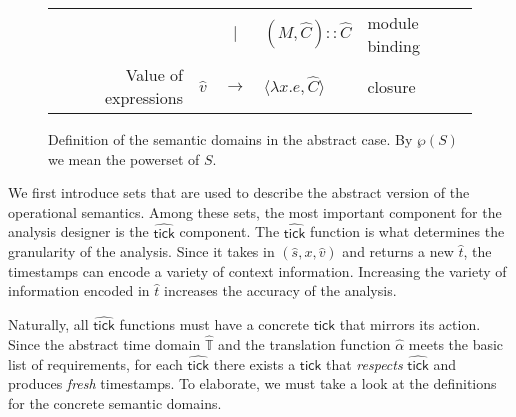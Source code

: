 \documentclass{article}
\theoremstyle{definition}
\newcommand*{\vbar}{|}
\newcommand*{\cons}{::}
\newcommand*{\Time}{\mathbb{T}}
\newcommand*{\tick}{\mathsf{tick}}
\begin{document}
\begin{figure}[h!]
\begin{tabular}{rrcll}
                                 &                   & $\vbar$       & $(M,\widehat{C})\cons \widehat{C}$                                                                        & module binding     \\
    Value of expressions         & $\widehat{v}$     & $\rightarrow$ & $\langle \lambda x.e, \widehat{C} \rangle$                                                                & closure
  \end{tabular}
  \caption{Definition of the semantic domains in the abstract case. By $\wp(S)$ we mean the powerset of $S$.}
\end{figure}
We first introduce sets that are used to describe the abstract version of the operational semantics.
Among these sets, the most important component for the analysis designer is the $\widehat{\tick}$ component.
The $\widehat{\tick}$ function is what determines the granularity of the analysis.
Since it takes in $(\widehat{s},x,\widehat{v})$ and returns a new $\widehat{t}$, the timestamps can encode a variety of context information.
Increasing the variety of information encoded in $\widehat{t}$ increases the accuracy of the analysis.

Naturally, all $\widehat{\tick}$ functions must have a concrete $\tick$ that mirrors its action.
Since the abstract time domain $\widehat{\Time}$ and the translation function $\widehat{\alpha}$ meets the basic list of requirements, for each $\widehat{\tick}$ there exists a $\tick$ that \emph{respects} $\widehat{\tick}$ and produces \emph{fresh} timestamps.
To elaborate, we must take a look at the definitions for the concrete semantic domains.
\end{document}
